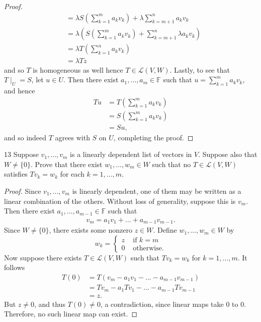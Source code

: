 \documentclass{extarticle}
\newenvironment{problem}[1]{\begin{prob*}{#1}{}}{\end{prob*}}
\newcommand{\F}{\mathbb{F}}
\newcommand{\Hom}{\mathcal{L}}
\begin{document}
\begin{proof}
\begin{align*}
&= \lambda S\left(\sum_{k=1}^ma_kv_k\right) + \lambda\sum_{k=m+1}^n a_kv_k\\
&= \lambda\left(S\left(\sum_{k=1}^ma_kv_k\right) + \sum_{k=m+1}^n\lambda a_kv_k\right)\\
&= \lambda T\left(\sum_{k=1}^na_kv_k\right)\\
&= \lambda Tz
\end{align*}
and so $T$ is homogeneous as well hence $T\in\Hom(V,W)$.  Lastly, to see that $T\mid_U = S$, let $u\in U$.  Then there exist $a_1,\dots, a_m\in\F$ such that $u=\sum_{k=1}^ma_kv_k$, and hence
\begin{align*}
Tu &= T\left( \sum_{k=1}^ma_kv_k\right)\\
&= S\left(\sum_{k=1}^ma_kv_k\right)\\
&= Su,
\end{align*}
and so indeed $T$ agrees with $S$ on $U$, completing the proof.
\end{proof}

\begin{problem}{13}
Suppose $v_1,\dots, v_m$ is a linearly dependent list of vectors in $V$.  Suppose also that $W\neq\{0\}$.  Prove that there exist $w_1,\dots, w_m\in W$ such that no $T\in\Hom(V,W)$ satisfies $Tv_k=w_k$ for each $k = 1,\dots, m$.
\end{problem}
\begin{proof}
Since $v_1,\dots,v_m$ is linearly dependent, one of them may be written as a linear combination of the others.  Without loss of generality, suppose this is $v_m$.  Then there exist $a_1,\dots,a_{m-1}\in\F$ such that
\begin{align*}
v_m = a_1v_1 + \dots + a_{m-1}v_{m-1}.
\end{align*}
Since $W\neq\{0\}$, there exists some nonzero $z\in W$.  Define $w_1,\dots,w_m\in W$ by
\begin{equation*}
w_k = \begin{cases}z &\text{ if }k = m\\ 0 &\text{ otherwise.} \end{cases}
\end{equation*}
Now suppose there exists $T\in\Hom(V,W)$ such that $Tv_k = w_k$ for $k = 1,\dots, m$.  It follows
\begin{align*}
T(0) &= T(v_m - a_1v_1 - \dots - a_{m-1}v_{m-1})\\
 &= Tv_m - a_1Tv_1 - \dots - a_{m-1}Tv_{m-1}\\
&= z.
\end{align*}
But $z\neq0$, and thus $T(0)\neq 0$, a contradiction, since linear maps take $0$ to $0$.  Therefore, no such linear map can exist.
\end{proof}
\end{document}
